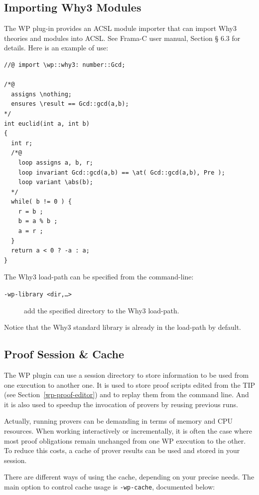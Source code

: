 \pagebreak
\subsection{Importing Why3 Modules}
\label{importer}

The \textsf{WP} plug-in provides an \textsf{ACSL} module importer that
can import \textsf{Why3} theories and modules into \textsf{ACSL}.
See \textsf{Frama-C} user manual, Section § 6.3 for details.
Here is an example of use:

\begin{lstlisting}
//@ import \wp::why3: number::Gcd;

/*@
  assigns \nothing;
  ensures \result == Gcd::gcd(a,b);
*/
int euclid(int a, int b)
{
  int r;
  /*@
    loop assigns a, b, r;
    loop invariant Gcd::gcd(a,b) == \at( Gcd::gcd(a,b), Pre );
    loop variant \abs(b);
  */
  while( b != 0 ) {
    r = b ;
    b = a % b ;
    a = r ;
  }
  return a < 0 ? -a : a;
}
\end{lstlisting}

\noindent
The Why3 load-path can be specified from the command-line:
\begin{description}
  \item[\tt -wp-library <dir,\ldots>] add the specified directory to the Why3 load-path.
\end{description}

\noindent
Notice that the Why3 standard library is already in the load-path by default.

\clearpage
\subsection{Proof Session \& Cache}
\label{wp-cache}

The \textsf{WP} plugin can use a session directory to store information to be used from one execution to another one.
It is used to store proof scripts edited from the TIP (see Section~\ref{wp-proof-editor}) and to replay them from the command line.
And it is also used to speedup the invocation of provers by reusing previous runs.

Actually, running provers can be demanding in terms of memory and CPU resources. When working
interactively or incrementally, it is often the case where most proof obligations remain unchanged
from one \textsf{WP} execution to the other. To reduce this costs, a cache of prover results can be used
and stored in your session.

There are different ways of using the cache, depending on your precise needs.
The main option to control cache usage is \verb+-wp-cache+, documented below:

